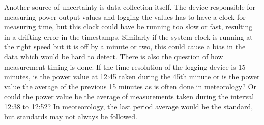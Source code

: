 Another source of uncertainty is data collection itself. The device responsible for measuring power output values and logging the values has to have a clock for measuring time, but this clock could have be running too slow or fast, resulting in a drifting error in the timestamps. Similarly if the system clock is running at the right speed but it is off by a minute or two, this could cause a bias in the data which would be hard to detect. There is also the question of how measurement timing is done. If the time resolution of the logging device is 15 minutes, is the power value at 12:45 taken during the 45th minute or is the power value the average of the previous 15 minutes as is often done in meteorology? Or could the power value be the average of measurements taken during the interval 12:38 to 12:52? In meoteorology, the last period average would be the standard, but standards may not always be followed.























